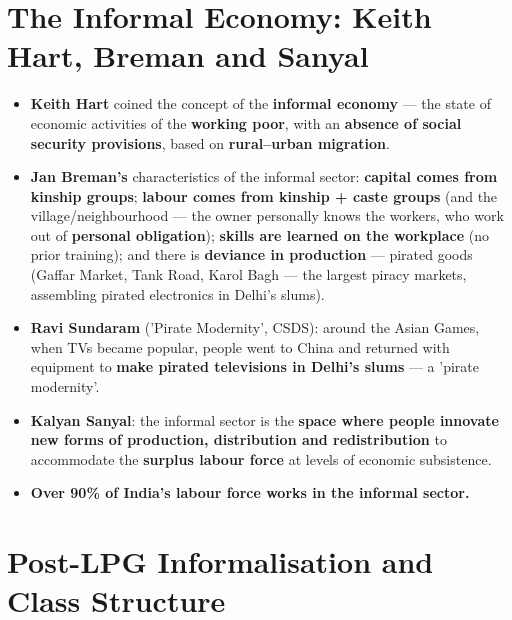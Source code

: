 \section{The Informal Economy: Keith Hart, Breman and Sanyal}

\begin{KeyConcept}
\begin{itemize}
\item \textbf{Keith Hart} coined the concept of the \textbf{informal economy} --- the state of economic activities of the \textbf{working poor}, with an \textbf{absence of social security provisions}, based on \textbf{rural--urban migration}.
\item \textbf{Jan Breman's} characteristics of the informal sector: \textbf{capital comes from kinship groups}; \textbf{labour comes from kinship + caste groups} (and the village/neighbourhood --- the owner personally knows the workers, who work out of \textbf{personal obligation}); \textbf{skills are learned on the workplace} (no prior training); and there is \textbf{deviance in production} --- pirated goods (Gaffar Market, Tank Road, Karol Bagh --- the largest piracy markets, assembling pirated electronics in Delhi's slums).
\item \textbf{Ravi Sundaram} ('Pirate Modernity', CSDS): around the Asian Games, when TVs became popular, people went to China and returned with equipment to \textbf{make pirated televisions in Delhi's slums} --- a 'pirate modernity'.
\item \textbf{Kalyan Sanyal}: the informal sector is the \textbf{space where people innovate new forms of production, distribution and redistribution} to accommodate the \textbf{surplus labour force} at levels of economic subsistence.
\item \textbf{Over 90\% of India's labour force works in the informal sector.}
\end{itemize}
\end{KeyConcept}

\section{Post-LPG Informalisation and Class Structure}

